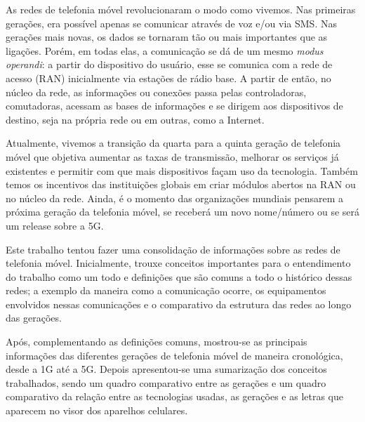 \documentclass[11pt,oneside,a4paper]{abntex2}
\begin{document}
As redes de telefonia móvel revolucionaram o modo como vivemos. Nas primeiras gerações, era possível apenas se comunicar através de voz e/ou via SMS. Nas gerações mais novas, os dados se tornaram tão ou mais importantes que as ligações. Porém, em todas elas, a comunicação se dá de um mesmo \textit{modus operandi}: a partir do dispositivo do usuário, esse se comunica com a rede de acesso (RAN) inicialmente via estações de rádio base. A partir de então, no núcleo da rede, as informações ou conexões passa pelas controladoras, comutadoras, acessam as bases de informações e se dirigem aos dispositivos de destino, seja na própria rede ou em outras, como a Internet.

Atualmente, vivemos a transição da quarta para a quinta geração de telefonia móvel que objetiva aumentar as taxas de transmissão, melhorar os serviços já existentes e permitir com que mais dispositivos façam uso da tecnologia. Também temos os incentivos das instituições globais em criar módulos abertos na RAN ou no núcleo da rede. Ainda, é o momento das organizações mundiais pensarem a próxima geração da telefonia móvel, se receberá um novo nome/número ou se será um release sobre a 5G.

Este trabalho tentou fazer uma consolidação de informações sobre as redes de telefonia móvel. Inicialmente, trouxe conceitos importantes para o entendimento do trabalho como um todo e definições que são comuns a todo o histórico dessas redes; a exemplo da maneira como a comunicação ocorre, os equipamentos envolvidos nessas comunicações e o comparativo da estrutura das redes ao longo das gerações.

Após, complementando as definições comuns, mostrou-se as principais informações das diferentes gerações de telefonia móvel de maneira cronológica, desde a 1G até a 5G. Depois apresentou-se uma sumarização dos conceitos trabalhados, sendo um quadro comparativo entre as gerações e um quadro comparativo da relação entre as tecnologias usadas, as gerações e as letras que aparecem no visor dos aparelhos celulares.


\label{biblio}
\end{document}
